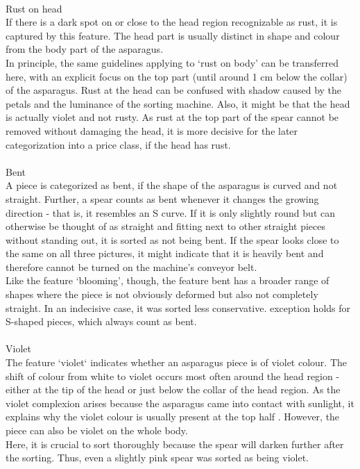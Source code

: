  \\
Rust on head \\
If there is a dark spot on or close to the head region recognizable as rust, it is captured by this feature. The head part is usually distinct in shape and colour from the body part of the asparagus. \\
In principle, the same guidelines applying to ‘rust on body’ can be transferred here, with an explicit focus on the top part (until around 1 cm below the collar) of the asparagus. Rust at the head can be confused with shadow caused by the petals and the luminance  of the sorting machine. Also, it might be that the head is actually violet and not rusty.
As rust at the top part of the spear cannot be removed without damaging the head, it is more decisive for the later categorization into a price class, if the head has rust. \\
 \\
Bent \\
A piece is categorized as bent, if the shape of the asparagus is curved and not straight.
Further, a spear counts as bent whenever it changes the growing direction - that is, it resembles an S curve. If it is only slightly round but can otherwise be thought of as straight and fitting next to other straight pieces without standing out, it is sorted as not being bent. If the spear looks close to the same on all three pictures, it might indicate that it is heavily bent and therefore cannot be turned on the machine’s conveyor belt. \\
Like the feature ‘blooming’, though, the feature bent has a broader range of shapes where the piece is not obviously deformed but also not completely straight. In an indecisive case, it was sorted less conservative. exception holds for S-shaped pieces, which always count as bent. \\
 \\
Violet \\
The feature ‘violet‘ indicates whether an asparagus piece is of violet colour.
The shift of colour from white to violet occurs most often around the head region - either at the tip of the head or just below the collar of the head region. As the violet complexion arises because the asparagus came into contact with sunlight, it explains why the violet colour is usually present at the top half . However, the piece can also be violet on the whole body. \\
Here, it is crucial to sort thoroughly because the spear will darken further after the sorting. Thus, even a slightly pink spear was sorted as being violet. \\
